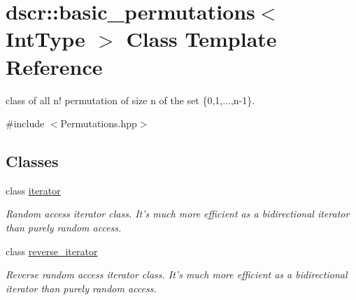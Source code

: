 \hypertarget{classdscr_1_1basic__permutations}{\section{dscr\-:\-:basic\-\_\-permutations$<$ Int\-Type $>$ Class Template Reference}
\label{classdscr_1_1basic__permutations}
}


class of all n! permutation of size n of the set \{0,1,...,n-\/1\}.  




{\ttfamily \#include $<$Permutations.\-hpp$>$}

\subsection*{Classes}
\begin{DoxyCompactItemize}
\item 
class \hyperlink{classdscr_1_1basic__permutations_1_1iterator}{iterator}
\begin{DoxyCompactList}\small\item\em Random access iterator class. It's much more efficient as a bidirectional iterator than purely random access. \end{DoxyCompactList}\item 
class \hyperlink{classdscr_1_1basic__permutations_1_1reverse__iterator}{reverse\-\_\-iterator}
\begin{DoxyCompactList}\small\item\em Reverse random access iterator class. It's much more efficient as a bidirectional iterator than purely random access. \end{DoxyCompactList}\end{DoxyCompactItemize}
